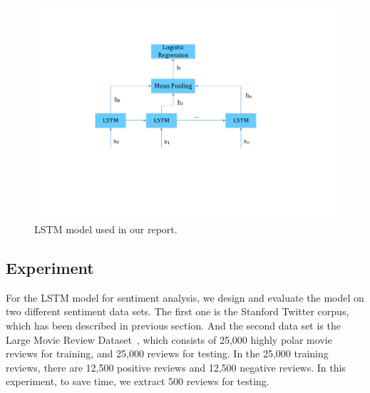 \begin{figure}
\centering
\includegraphics[scale=0.5]{figure/lstm_model.pdf}
\caption{LSTM model used in our report.}
\label{fig:lstm_model}
\end{figure}

\subsection{Experiment}


For the LSTM model for sentiment analysis, we design and evaluate the model on two different sentiment data sets. The first one is the Stanford Twitter corpus, which has been described in previous section. And the second data set is the Large Movie Review Dataset~\cite{maas2011}, which consists of 25,000 highly polar movie reviews for training, and 25,000 reviews for testing. In the 25,000 training reviews, there are 12,500 positive reviews and 12,500 negative reviews. In this experiment, to save time, we extract 500 reviews for testing.

